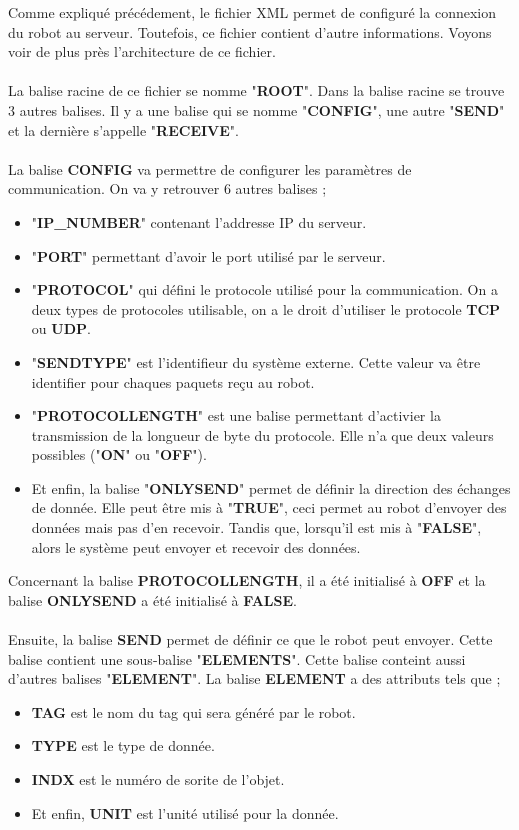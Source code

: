 Comme expliqué précédement, le fichier XML permet de configuré la connexion du robot au serveur.
Toutefois, ce fichier contient d'autre informations.
Voyons voir de plus près l'architecture de ce fichier.
\\
\\
La balise racine de ce fichier se nomme "\textbf{ROOT}".
Dans la balise racine se trouve 3 autres balises.
Il y a une balise qui se nomme "\textbf{CONFIG}", une autre "\textbf{SEND}" et la dernière s'appelle "\textbf{RECEIVE}".
\\
\\
La balise \textbf{CONFIG} va permettre de configurer les paramètres de communication.
On va y retrouver 6 autres balises ;
\begin{itemize}
    \item "\textbf{IP\_NUMBER}" contenant l'addresse IP du serveur.
    \item "\textbf{PORT}" permettant d'avoir le port utilisé par le serveur.
    \item "\textbf{PROTOCOL}" qui défini le protocole utilisé pour la communication. On a deux types de protocoles utilisable, on a le droit d'utiliser le protocole \textbf{TCP} ou \textbf{UDP}.
    \item "\textbf{SENDTYPE}" est l'identifieur du système externe. Cette valeur va être identifier pour chaques paquets reçu au robot.
    \item "\textbf{PROTOCOLLENGTH}" est une balise permettant d'activier la transmission de la longueur de byte du protocole. Elle n'a que deux valeurs possibles ("\textbf{ON}" ou "\textbf{OFF}").
    \item Et enfin, la balise "\textbf{ONLYSEND}" permet de définir la direction des échanges de donnée. Elle peut être mis à "\textbf{TRUE}", ceci permet au robot d'envoyer des données mais pas d'en recevoir. Tandis que, lorsqu'il est mis à "\textbf{FALSE}", alors le système peut envoyer et recevoir des données. 
\end{itemize}
Concernant la balise \textbf{PROTOCOLLENGTH}, il a été initialisé à \textbf{OFF} et la balise \textbf{ONLYSEND} a été initialisé à \textbf{FALSE}.
\\
\\
Ensuite, la balise \textbf{SEND} permet de définir ce que le robot peut envoyer.
Cette balise contient une sous-balise "\textbf{ELEMENTS}".
Cette balise conteint aussi d'autres balises "\textbf{ELEMENT}".
La balise \textbf{ELEMENT} a des attributs tels que ;
\begin{itemize}
    \item \textbf{TAG} est le nom du tag qui sera généré par le robot.
    \item \textbf{TYPE} est le type de donnée.
    \item \textbf{INDX} est le numéro de sorite de l'objet.
    \item Et enfin, \textbf{UNIT} est l'unité utilisé pour la donnée.
\end{itemize}

